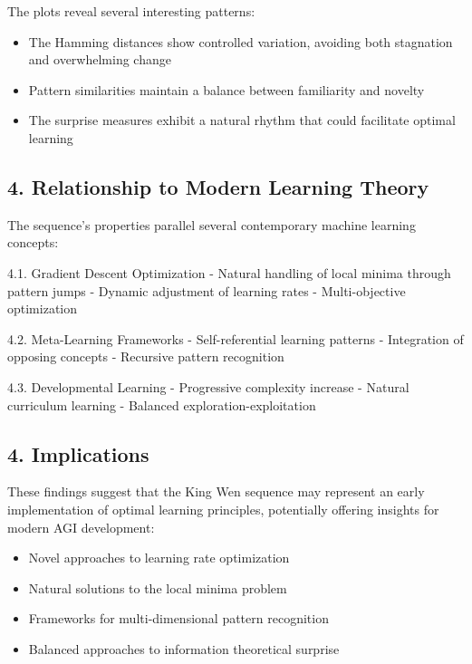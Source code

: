 \documentclass{article}
\begin{document}
The plots reveal several interesting patterns:
\begin{itemize}
\item The Hamming distances show controlled variation, avoiding both stagnation and overwhelming change
\item Pattern similarities maintain a balance between familiarity and novelty
\item The surprise measures exhibit a natural rhythm that could facilitate optimal learning
\end{itemize}

\subsection{4. Relationship to Modern Learning Theory}

The sequence's properties parallel several contemporary machine learning concepts:

4.1. Gradient Descent Optimization
- Natural handling of local minima through pattern jumps
- Dynamic adjustment of learning rates
- Multi-objective optimization

4.2. Meta-Learning Frameworks \cite{finn2017modelagnosticmetalearningfastadaptation}
- Self-referential learning patterns
- Integration of opposing concepts
- Recursive pattern recognition

4.3. Developmental Learning \cite{schmidhuber2006developmental}
- Progressive complexity increase
- Natural curriculum learning
- Balanced exploration-exploitation

\subsection{4. Implications}

These findings suggest that the King Wen sequence may represent an early
implementation of optimal learning principles, potentially offering insights
for modern AGI development:

\begin{itemize}
\tightlist
\item Novel approaches to learning rate optimization
\item Natural solutions to the local minima problem
\item Frameworks for multi-dimensional pattern recognition
\item Balanced approaches to information theoretical surprise
\end{itemize}
\end{document}
